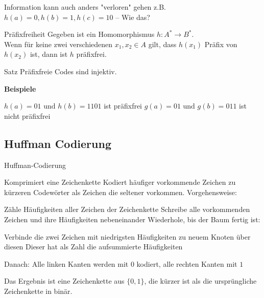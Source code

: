 \begin{frame}
	\begin{itemize}
		\pitem Information kann auch anders "verloren" gehen
		\pitem[$\rightarrow$] z.B. $h(a) = 0, h(b) = 1, h(c) = 10$ \p -- Wie das?
	\end{itemize} \pause
	\begin{block}{Präfixfreiheit}
		\p Gegeben ist ein Homomorphismus $h: A^* \rightarrow B^*$.\\
		\p Wenn für keine zwei verschiedenen $x_1, x_2 \in A$ gilt\p , dass $h(x_1)$  Präfix von $h(x_2)$ ist\p , dann ist $h$ präfixfrei. 
	\end{block}
	\pause
	\begin{block}{Satz}
		Präfixfreie Codes sind injektiv.
	\end{block} \pause
	\textbf{Beispiele}\\
	\begin{itemize}
		\pitem $h(a) = 01 \text{ und } h(b) = 1101 $ ist präfixfrei
		\pitem $g(a) = 01 \text{ und } g(b) = 011$ ist nicht präfixfrei
	\end{itemize}
\end{frame}

\subsection{Huffman Codierung}

\begin{frame}{Huffman-Codierung}
	\begin{itemize}
		\pitem Komprimiert eine Zeichenkette
		\pitem Kodiert häufiger vorkommende Zeichen zu kürzeren Codewörter als Zeichen die seltener vorkommen.
		\pitem Vorgehensweise:
		\begin{enumerate}
			\pitem Zähle Häufigkeiten aller Zeichen der Zeichenkette
			\pitem Schreibe alle vorkommenden Zeichen und ihre Häufigkeiten nebeneinander
			\pitem Wiederhole, bis der Baum fertig ist:
			\begin{itemize}
				\pitem Verbinde die zwei Zeichen mit niedrigsten Häufigkeiten zu neuem Knoten über diesen
				\pitem Dieser hat als Zahl die aufsummierte Häufigkeiten
			\end{itemize}
			\pitem Danach: Alle linken Kanten werden mit $0$ kodiert, alle rechten Kanten mit $1$
		\end{enumerate}
	\end{itemize}

	\p Das Ergebnis ist eine Zeichenkette aus $\{0,1\}$\p , die kürzer ist als die ursprüngliche Zeichenkette in binär.
\end{frame}

